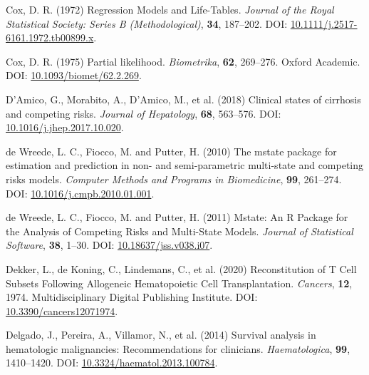 \documentclass[
  letterpaper,
  DIV=11,
  numbers=noendperiod]{scrreprt}
\newlength{\cslhangindent}
\newlength{\cslentryspacingunit} %
\newenvironment{CSLReferences}[2] %
 {%
  \setlength{\parindent}{0pt}
  \ifodd #1
  \let\oldpar\par
  \def\par{\hangindent=\cslhangindent\oldpar}
  \fi
  \setlength{\parskip}{#2\cslentryspacingunit}
 }%
 {}
\begin{document}
\begin{CSLReferences}{1}{0}
\leavevmode{}%
Cox, D. R. (1972) Regression {Models} and {Life-Tables}. \emph{Journal
of the Royal Statistical Society: Series B (Methodological)},
\textbf{34}, 187--202. DOI:
\href{https://doi.org/10.1111/j.2517-6161.1972.tb00899.x}{10.1111/j.2517-6161.1972.tb00899.x}.

\leavevmode{}%
Cox, D. R. (1975) Partial likelihood. \emph{Biometrika}, \textbf{62},
269--276. Oxford Academic. DOI:
\href{https://doi.org/10.1093/biomet/62.2.269}{10.1093/biomet/62.2.269}.

\leavevmode{}%
D'Amico, G., Morabito, A., D'Amico, M., et al. (2018) Clinical states of
cirrhosis and competing risks. \emph{Journal of Hepatology},
\textbf{68}, 563--576. DOI:
\href{https://doi.org/10.1016/j.jhep.2017.10.020}{10.1016/j.jhep.2017.10.020}.

\leavevmode{}%
de Wreede, L. C., Fiocco, M. and Putter, H. (2010) The mstate package
for estimation and prediction in non- and semi-parametric multi-state
and competing risks models. \emph{Computer Methods and Programs in
Biomedicine}, \textbf{99}, 261--274. DOI:
\href{https://doi.org/10.1016/j.cmpb.2010.01.001}{10.1016/j.cmpb.2010.01.001}.

\leavevmode{}%
de Wreede, L. C., Fiocco, M. and Putter, H. (2011) Mstate: {An R
Package} for the {Analysis} of {Competing Risks} and {Multi-State
Models}. \emph{Journal of Statistical Software}, \textbf{38}, 1--30.
DOI:
\href{https://doi.org/10.18637/jss.v038.i07}{10.18637/jss.v038.i07}.

\leavevmode{}%
Dekker, L., de Koning, C., Lindemans, C., et al. (2020) Reconstitution
of {T Cell Subsets Following Allogeneic Hematopoietic Cell
Transplantation}. \emph{Cancers}, \textbf{12}, 1974. Multidisciplinary
Digital Publishing Institute. DOI:
\href{https://doi.org/10.3390/cancers12071974}{10.3390/cancers12071974}.

\leavevmode{}%
Delgado, J., Pereira, A., Villamor, N., et al. (2014) Survival analysis
in hematologic malignancies: Recommendations for clinicians.
\emph{Haematologica}, \textbf{99}, 1410--1420. DOI:
\href{https://doi.org/10.3324/haematol.2013.100784}{10.3324/haematol.2013.100784}.


\end{CSLReferences}
\end{document}
